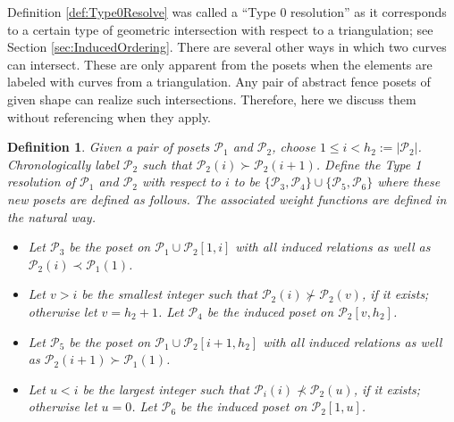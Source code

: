 \documentclass[12pt, letterpaper,table]{amsart}
\newtheorem{definition}[theorem]{Definition}
\theoremstyle{remark}
\newcommand{\calP}{\mathcal{P}}
\begin{document}
 Definition \ref{def:Type0Resolve} was called a ``Type 0 resolution'' as it corresponds to a certain type of geometric intersection with respect to a triangulation; see Section \ref{sec:InducedOrdering}. There are several other ways in which two curves can intersect. These are only apparent from the posets when the elements are labeled with curves from a triangulation. Any pair of abstract fence posets of given shape can realize such intersections. Therefore, here we discuss them without referencing when they apply.

\begin{definition}\label{def:Type1Resolution}
Given a pair of posets $\calP_1$ and $\calP_2$, choose $1 \leq i < h_2 := \vert \calP_2 \vert$. Chronologically label $\calP_2$ such that $\calP_2(i) \succ \calP_2(i+1)$. Define the \emph{Type 1 resolution} of $\calP_1$ and $\calP_2$ with respect to $i$ to be $\{\calP_3, \calP_4\} \cup \{\calP_5, \calP_6\}$ where these new posets are defined as follows. The associated weight functions are defined in the natural way.
\begin{itemize}
    \item  Let $\calP_3$  be the poset on $\calP_1 \cup \calP_2[1,i]$ with all induced relations as well as $\calP_2(i) \prec \calP_1(1)$.
    \item Let $v>i$ be the smallest integer such that $\calP_2(i) \not\succ \calP_2(v)$, if it exists; otherwise let $v = h_2 + 1$. Let $\calP_4$ be the induced poset on $\calP_2[v,h_2]$.
    \item Let $\calP_5$  be the poset on $\calP_1 \cup \calP_2[i+1,h_2]$ with all induced relations as well as $\calP_2(i+1) \succ \calP_1(1)$.
    \item Let $u<i$ be the largest integer such that $\calP_i(i) \not\prec \calP_2(u)$, if it exists; otherwise let $u=0$. Let  $\calP_6$ be the induced poset on $\calP_2[1,u]$.
\end{itemize}
\end{definition}
\end{document}
